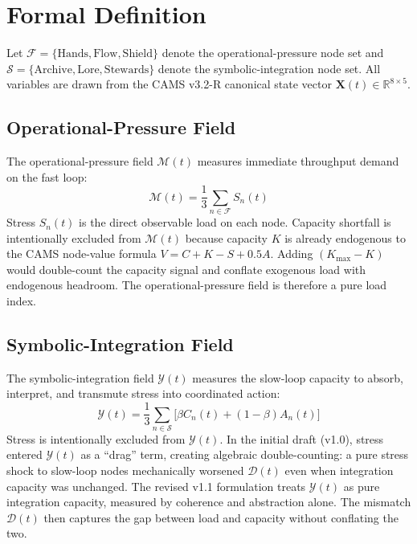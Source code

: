 \documentclass[11pt,a4paper]{article}
\begin{document}
\section{Formal Definition}
Let \(\mathcal{F}=\{\text{Hands},\text{Flow},\text{Shield}\}\) denote the operational-pressure node set and \(\mathcal{S}=\{\text{Archive},\text{Lore},\text{Stewards}\}\) denote the symbolic-integration node set. All variables are drawn from the CAMS v3.2-R canonical state vector \(\mathbf{X}(t)\in\mathbb{R}^{8\times5}\).

\subsection{Operational-Pressure Field}
The operational-pressure field \(\mathcal{M}(t)\) measures immediate throughput demand on the fast loop:
\begin{equation}
\mathcal{M}(t) = \frac{1}{3}\sum_{n \in \mathcal{F}} S_n(t)
\end{equation}
Stress \(S_n(t)\) is the direct observable load on each node. Capacity shortfall is intentionally excluded from \(\mathcal{M}(t)\) because capacity \(K\) is already endogenous to the CAMS node-value formula \(V=C+K-S+0.5A\). Adding \((K_{\max}-K)\) would double-count the capacity signal and conflate exogenous load with endogenous headroom. The operational-pressure field is therefore a pure load index.

\subsection{Symbolic-Integration Field}
The symbolic-integration field \(\mathcal{Y}(t)\) measures the slow-loop capacity to absorb, interpret, and transmute stress into coordinated action:
\begin{equation}
\mathcal{Y}(t) = \frac{1}{3}\sum_{n \in \mathcal{S}} \bigl[ \beta C_n(t) + (1-\beta) A_n(t) \bigr]
\end{equation}
Stress is intentionally excluded from \(\mathcal{Y}(t)\). In the initial draft (v1.0), stress entered \(\mathcal{Y}(t)\) as a ``drag'' term, creating algebraic double-counting: a pure stress shock to slow-loop nodes mechanically worsened \(\mathcal{D}(t)\) even when integration capacity was unchanged. The revised v1.1 formulation treats \(\mathcal{Y}(t)\) as pure integration capacity, measured by coherence and abstraction alone. The mismatch \(\mathcal{D}(t)\) then captures the gap between load and capacity without conflating the two.
\end{document}

